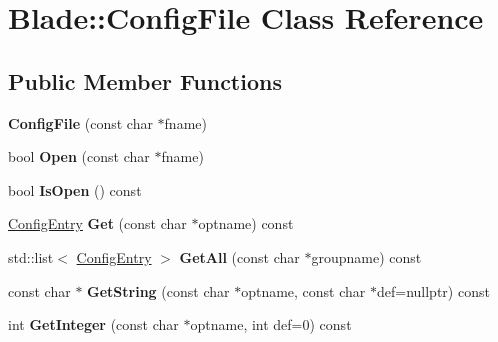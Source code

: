 \hypertarget{class_blade_1_1_config_file}{}\section{Blade\+:\+:Config\+File Class Reference}
\label{class_blade_1_1_config_file}
\subsection*{Public Member Functions}
\begin{DoxyCompactItemize}
\item 
\mbox{\label{class_blade_1_1_config_file_aaf113f1e5d402c63625d397a30619f1b}} 
{\bfseries Config\+File} (const char $\ast$fname)
\item 
\mbox{\label{class_blade_1_1_config_file_aae189be82cf4f62839e5c668ac8faeef}} 
bool {\bfseries Open} (const char $\ast$fname)
\item 
\mbox{\label{class_blade_1_1_config_file_a28e0d8ec6d97a67442795d939c347f12}} 
bool {\bfseries Is\+Open} () const
\item 
\mbox{\label{class_blade_1_1_config_file_afcb28d317c1291e5b7d56da5b5d91d40}} 
\hyperlink{class_blade_1_1_config_entry}{Config\+Entry} {\bfseries Get} (const char $\ast$optname) const
\item 
\mbox{\label{class_blade_1_1_config_file_a2f177d8c7cde9124088da117d71d470d}} 
std\+::list$<$ \hyperlink{class_blade_1_1_config_entry}{Config\+Entry} $>$ {\bfseries Get\+All} (const char $\ast$groupname) const
\item 
\mbox{\label{class_blade_1_1_config_file_a0038b08cc76f58996a2c4f31a3bfda64}} 
const char $\ast$ {\bfseries Get\+String} (const char $\ast$optname, const char $\ast$def=nullptr) const
\item 
\mbox{\label{class_blade_1_1_config_file_a8321c4f637586b2ddd8729ce3d476304}} 
int {\bfseries Get\+Integer} (const char $\ast$optname, int def=0) const
\item 

\end{DoxyCompactItemize}
